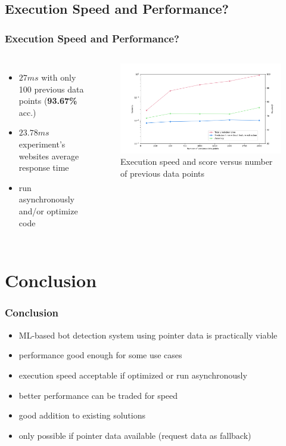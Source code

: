 \documentclass[t,aspectratio=169,table]{beamer}
\begin{document}
\subsection{Execution Speed and Performance?}
\begin{frame}
\frametitle{Execution Speed and Performance?}

\begin{columns}
\begin{itemize}
    \item \textbf{$27ms$} with only 100 previous data points (\textbf{93.67\%} acc.)
    \item $23.78ms$ experiment's websites average response time
    \item run asynchronously and/or optimize code
\end{itemize}

\begin{centering}
\begin{figure}
    \includegraphics[width=\textwidth]{figures/speed_per_dp_count.png}
    \caption{Execution speed and score versus number of previous data points}
    \label{fig:speed_per_dp_count}
\end{figure}
\end{centering}

\end{columns}

\end{frame}

\section{Conclusion}
\begin{frame}
\frametitle{Conclusion}
\begin{itemize}
    \item ML-based bot detection system using pointer data is practically viable
    \item performance good enough for some use cases
    \item execution speed acceptable if optimized or run asynchronously
    \item better performance can be traded for speed
    \item good addition to existing solutions
    \item only possible if pointer data available (request data as fallback)
\end{itemize}
\end{frame}
\end{document}
